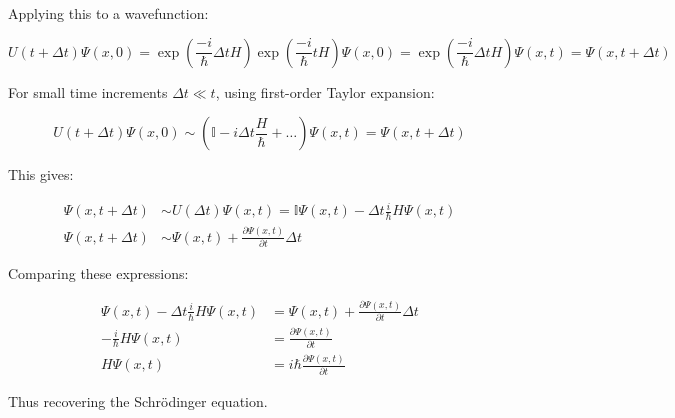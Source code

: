 Applying this to a wavefunction:

\begin{equation}
U(t+\Delta t) \Psi(x, 0)=\exp \left(\frac{-i}{\hbar} \Delta t H\right) \exp \left(\frac{-i}{\hbar} t H\right) \Psi(x, 0)=\exp \left(\frac{-i}{\hbar} \Delta t H\right) \Psi(x, t)=\Psi(x, t+\Delta t)
\end{equation}

For small time increments $\Delta t \ll t$, using first-order Taylor expansion:

\begin{equation}
U(t+\Delta t) \Psi(x, 0) \sim\left(\mathbb{I}-i \Delta t \frac{H}{\hbar}+\ldots\right) \Psi(x, t)=\Psi(x, t+\Delta t)
\end{equation}

This gives:

\begin{align}
\Psi(x, t+\Delta t) & \sim U(\Delta t) \Psi(x, t)=\mathbb{I} \Psi(x, t)-\Delta t \frac{i}{\hbar} H \Psi(x, t)  \\
\Psi(x, t+\Delta t) & \sim \Psi(x, t)+\frac{\partial \Psi(x, t)}{\partial t} \Delta t
\end{align}

Comparing these expressions:

\begin{align}
\Psi(x, t)-\Delta t \frac{i}{\hbar} H \Psi(x, t) & =\Psi(x, t)+\frac{\partial \Psi(x, t)}{\partial t} \Delta t \\
-\frac{i}{\hbar} H \Psi(x, t) & =\frac{\partial \Psi(x, t)}{\partial t}  \\
H \Psi(x, t) & =i \hbar \frac{\partial \Psi(x, t)}{\partial t}
\end{align}

Thus recovering the Schrödinger equation.
